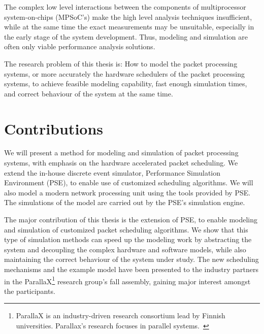 The complex low level interactions between the components of multiprocessor system-on-chips (MPSoC's) make the high level analysis techniques insufficient, while at the same time the exact measurements may be unsuitable, especially in the early stage of the system development. Thus, modeling and simulation are often only viable performance analysis solutions.

The research problem of this thesis is: How to model the packet processing systems, or more accurately the hardware schedulers of the packet processing systems, to achieve feasible modeling capability, fast enough simulation times, and correct behaviour of the system at the same time.

\section{Contributions}
We will present a method for modeling and simulation of packet processing systems, with emphasis on the hardware accelerated packet scheduling. We extend the in-house discrete event simulator, Performance Simulation Environment (PSE), to enable use of customized scheduling algorithms. We will also model a modern network processing unit using the tools provided by PSE. The simulations of the model are carried out by the PSE's simulation engine.

The major contribution of this thesis is the extension of PSE, to enable modeling and simulation of customized packet scheduling algorithms. We show that this type of simulation methods can speed up the modeling work by abstracting the system and decoupling the complex hardware and software models, while also maintaining the correct behaviour of the system under study. The new scheduling mechanisms and the example model have been presented to the industry partners in the ParallaX\footnote{ParallaX is an industry-driven research consortium lead by Finnish universities. Parallax's research focuses in parallel systems.~\cite{Lilius:2012:ParallaX}} research group's fall assembly, gaining major interest amongst the participants.

